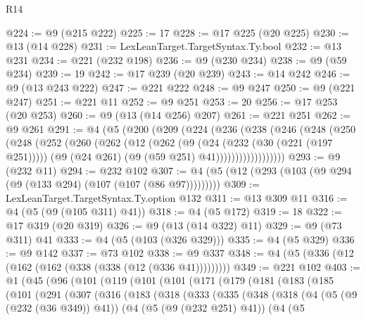 \begin{lexlean}{R14}
\begin{coremodule}
@224 := @9 (@215 @222)
@225 := 17
@228 := @17 @225 (@20 @225)
@230 := @13 (@14 @228)
@231 := LexLeanTarget.TargetSyntax.Ty.bool
@232 := @13 @231
@234 := @221 (@232 @198)
@236 := @9 (@230 @234)
@238 := @9 (@59 @234)
@239 := 19
@242 := @17 @239 (@20 @239)
@243 := @14 @242
@246 := @9 (@13 @243 @222)
@247 := @221 @222
@248 := @9 @247
@250 := @9 (@221 @247)
@251 := @221 @11
@252 := @9 @251
@253 := 20
@256 := @17 @253 (@20 @253)
@260 := @9 (@13 (@14 @256) @207)
@261 := @221 @251
@262 := @9 @261
@291 := @4
    (@5
      (@200
        (@209
          (@224
            (@236
              (@238
                (@246
                  (@248
                    (@250
                      (@248
                        (@252
                          (@260
                            (@262
                              (@12
                                (@262
                                  (@9
                                    (@24 (@232 (@30 (@221 (@197 @251)))))
                                    (@9 (@24 @261) (@9 (@59 @251) @41))))))))))))))))))
@293 := @9 (@232 @11)
@294 := @232 @102
@307 := @4 (@5 (@12 (@293 (@103 (@9 @294 (@9 (@133 @294) (@107 (@107 (@86 @97)))))))))
@309 := LexLeanTarget.TargetSyntax.Ty.option @132
@311 := @13 @309 @11
@316 := @4 (@5 (@9 (@105 @311) @41))
@318 := @4 (@5 @172)
@319 := 18
@322 := @17 @319 (@20 @319)
@326 := @9 (@13 (@14 @322) @11)
@329 := @9 (@73 @311) @41
@333 := @4 (@5 (@103 (@326 @329)))
@335 := @4 (@5 @329)
@336 := @9 @142
@337 := @73 @102
@338 := @9 @337
@348 := @4 (@5 (@336 (@12 (@162 (@162 (@338 (@338 (@12 (@336 @41)))))))))
@349 := @221 @102
@403 := @1
    (@45
      (@96
        (@101
          (@119
            (@101
              (@101
                (@171
                  (@179
                    (@181
                      (@183
                        (@185
                          (@101
                            (@291
                              (@307
                                (@316
                                  (@183
                                    (@318
                                      (@333
                                        (@335
                                          (@348
                                            (@318
                                              (@4
                                                (@5 (@9 (@232 (@36 @349)) @41))
                                                (@4
                                                  (@5 (@9 (@232 @251) @41))
                                                  (@4
                                                    (@5

\end{coremodule}
\end{lexlean}

